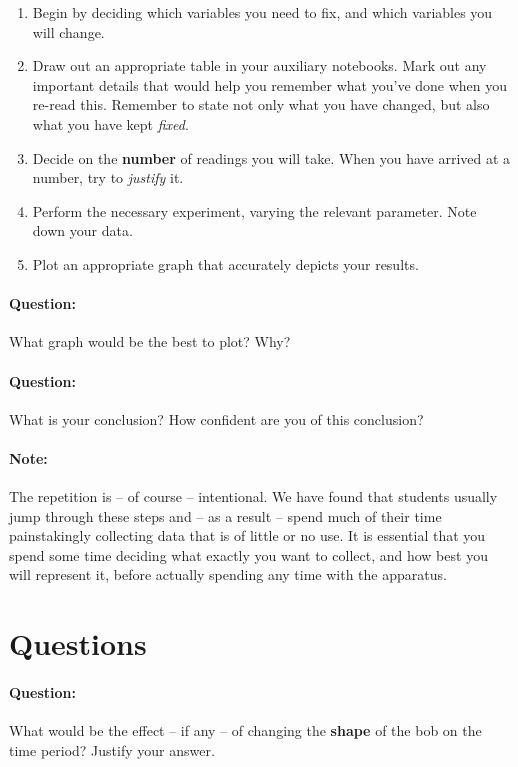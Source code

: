\begin{enumerate}
    \item Begin by deciding which variables you need to fix, and which variables you will change.
    
    \item Draw out an appropriate table in your auxiliary notebooks. Mark out any important details that would help you remember what you've done when you re-read this. Remember to state not only what you have changed, but also what you have kept \textit{fixed}.
    
    \item Decide on the \textbf{number} of readings you will take. When you have arrived at a number, try to \textit{justify} it.
    
    \item Perform the necessary experiment, varying the relevant parameter. Note down your data.
    
    \item Plot an appropriate graph that accurately depicts your results.
\end{enumerate}


\begin{question}
\paragraph{Question:} What graph would be the best to plot? Why? ~\\

\paragraph{Question:} What is your conclusion? How confident are you of this conclusion?
\end{question}

\paragraph{Note:} The repetition is -- of course -- intentional. We have found that students usually jump through these steps and -- as a result -- spend much of their time painstakingly collecting data that is of little or no use. It is essential that you spend some time deciding what exactly you want to collect, and how best you will represent it, before actually spending any time with the apparatus.



\section{Questions}

\begin{question}
\paragraph{Question:} What would be the effect -- if any -- of changing the \textbf{shape} of the bob on the time period? Justify your answer.
\end{question}